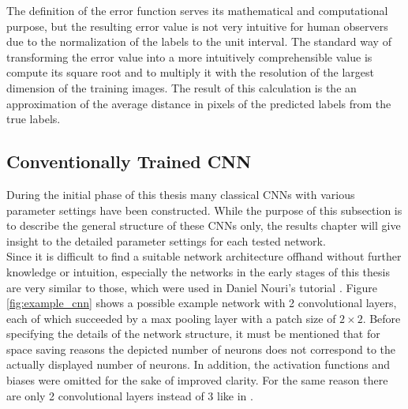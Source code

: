 \documentclass[11pt, a4paper]{article}
\begin{document}
The definition of the error function serves its mathematical and computational purpose, but the resulting error value is not very intuitive for human observers due to the normalization of the labels to the unit interval. The standard way of transforming the error value into a more intuitively comprehensible value is compute its square root and to multiply it with the resolution of the largest dimension of the training images. The result of this calculation is the an approximation of the average distance in pixels of the predicted labels from the true labels.

\subsection{Conventionally Trained CNN}

During the initial phase of this thesis many classical \acp{CNN} with various parameter settings have been constructed. While the purpose of this subsection is to describe the general structure of these \acp{CNN} only, the results chapter will give insight to the detailed para\-meter settings for each tested network.\\
Since it is difficult to find a suitable network architecture offhand without further knowledge or intuition, especially the networks in the early stages of this thesis are very similar to those, which were used in Daniel Nouri's tutorial \cite{nouri-tutorial}. Figure \ref{fig:example_cnn} shows a possible example network with 2 convolutional layers, each of which succeeded by a max pooling layer with a patch size of $2\times 2$. Before specifying the details of the network structure, it must be mentioned that for space saving reasons the depicted number of neurons does not correspond to the actually displayed number of neurons. In addition, the activation functions and biases were omitted for the sake of improved clarity. For the same reason there are only 2 convolutional layers instead of 3 like in \cite{nouri-tutorial}.
\\
\end{document}
